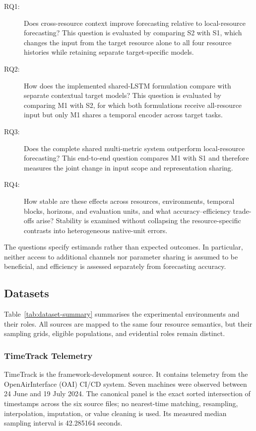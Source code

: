 \documentclass[a4paper,fleqn]{cas-dc}
\begin{document}
\begin{description}
  \item[RQ1:] Does cross-resource context improve forecasting relative to
    local-resource forecasting?  This question is evaluated by comparing S2
    with S1, which changes the input from the target resource alone to all four
    resource histories while retaining separate target-specific models.
  \item[RQ2:] How does the implemented shared-LSTM formulation compare with
    separate contextual target models? This question is evaluated by
    comparing M1 with S2, for which both formulations receive all-resource
    input but only M1 shares a temporal encoder across target tasks.
  \item[RQ3:] Does the complete shared multi-metric system outperform
    local-resource forecasting?  This end-to-end question compares M1 with S1
    and therefore measures the joint change in input scope and representation
    sharing.
  \item[RQ4:] How stable are these effects across resources, environments,
    temporal blocks, horizons, and evaluation units, and what
    accuracy--efficiency trade-offs arise?  Stability is examined without
    collapsing the resource-specific contrasts into heterogeneous native-unit
    errors.
\end{description}

The questions specify estimands rather than expected outcomes.  In particular,
neither access to additional channels nor parameter sharing is assumed to be
beneficial, and efficiency is assessed separately from forecasting accuracy.

\subsection{Datasets}
\label{sec:datasets}

Table~\ref{tab:dataset-summary} summarises the experimental environments and
their roles.  All sources are mapped to the same four resource semantics, but
their sampling grids, eligible populations, and evidential roles remain
distinct.

\subsubsection{TimeTrack Telemetry}
\label{sec:timetrack-data}

TimeTrack is the framework-development source.  It contains telemetry from the
OpenAirInterface (OAI) CI/CD system.  Seven machines were observed between
24 June and 19 July 2024.  The canonical panel
is the exact sorted intersection of timestamps across the six source files; no
nearest-time matching, resampling, interpolation, imputation, or value cleaning
is used.  Its measured median sampling interval is 42.285164 seconds.
\end{document}
